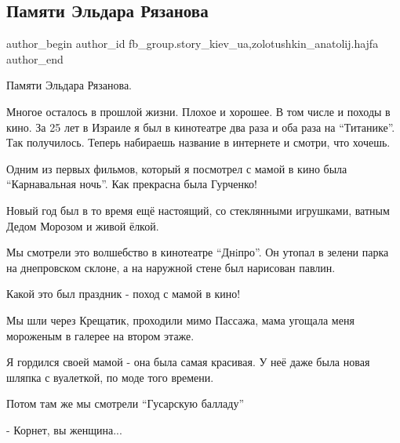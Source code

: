  
 
 
 
 
 
\subsection{Памяти Эльдара Рязанова}
\label{sec:09_12_2021.fb.fb_group.story_kiev_ua.1.pamjati_eldara_rjazanova}
 
\ifcmt
 author_begin
   author_id fb_group.story_kiev_ua,zolotushkin_anatolij.hajfa
 author_end
\fi

Памяти Эльдара Рязанова.

Многое осталось в прошлой жизни. Плохое и хорошее. В том числе и походы в кино.
За 25 лет в Израиле я был в кинотеатре два раза и оба раза на \enquote{Титанике}. Так
получилось. Теперь набираешь название в интернете и смотри, что хочешь.

Одним из первых фильмов, который я посмотрел с мамой в кино была \enquote{Карнавальная
ночь}.  Как прекрасна была Гурченко!


Новый год был в то время ещё настоящий, со стеклянными игрушками, ватным Дедом
Морозом и живой ёлкой.

Мы смотрели это волшебство в кинотеатре \enquote{Днiпро}. Он утопал в зелени парка на
днепровском склоне, а на наружной стене был нарисован павлин.

Какой это был праздник - поход с мамой в кино!

Мы шли через Крещатик, проходили мимо Пассажа, мама угощала меня мороженым в
галерее на втором этаже. 

Я гордился своей мамой - она была самая красивая. У неё даже была новая шляпка
с вуалеткой, по моде того времени.

Потом там же мы смотрели \enquote{Гусарскую балладу}

 - Корнет, вы женщина...

